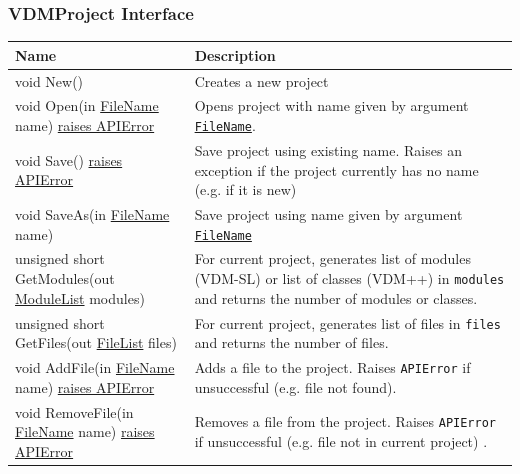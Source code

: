 \documentclass[\pformat,12pt]{article}
\newcommand{\pbs}[1]{\let\temp=\\#1\let\\=\temp}
\newenvironment{interfacetable}{%
  \begin{longtable}{|>{\pbs\raggedright\ttfamily}p{6.6cm}%
                    |>{\pbs\raggedright}p{6.6cm}|} \hline
  \textrm{\bfseries Name} &  \textbf{Description} \\ \hline
  \endhead
  }{\end{longtable}}
\newcommand{\APIError}{\hyperlink{exception.APIError}{raises APIError}}
\newcommand{\ModuleList}{\hyperlink{type.ModuleList}{ModuleList}}
\newcommand{\FileName}{\hyperlink{type.FileName}{FileName}}
\newcommand{\FileList}{\hyperlink{type.FileList}{FileList}}
\begin{document}
\subsubsection{VDMProject Interface}
\mbox{}
\begin{interfacetable}
void New()                                    & Creates a new project
\\ \hline
void Open(in {\FileName} name) \APIError         & Opens project with name 
                                                given by argument \texttt{\FileName}. 
\\ \hline
void Save() \APIError                         & Save project using existing 
                                                name. Raises an
                                                exception if the
                                                project currently has
                                                no name (e.g. if it is new)
\\ \hline
void SaveAs(in {\FileName} name) %
  & Save project using name given by argument \texttt{\FileName}
\\ \hline
unsigned short GetModules(out {\ModuleList} modules) & For current project, 
                                                generates list of modules  
                                                (VDM-SL) or list of classes
                                                (VDM++) in \texttt{modules}
                                                and returns the number of
                                                modules or classes.
\\ \hline
\hyperdef{method}{VDMProject::GetFiles}%
unsigned short GetFiles(out {\FileList} files)   & For current project, 
                                                generates list of files in 
                                                \texttt{files} and returns 
                                                the number of files.
\\ \hline
void AddFile(in {\FileName} name) \APIError      & Adds a file to the project.
                                                Raises \texttt{APIError} if 
                                                unsuccessful (e.g. file not 
                                                found).
\\ \hline
void RemoveFile(in {\FileName} name) \APIError   & Removes a file from the
                                                project. Raises 
                                                \texttt{APIError} if 
                                                unsuccessful (e.g. file not 
                                                in current project) .
\\ \hline
\end{interfacetable}
\end{document}
